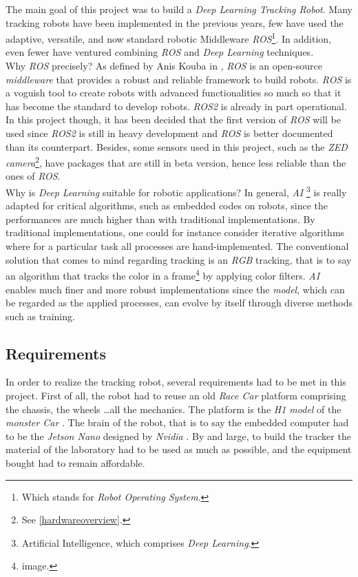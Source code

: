 		The main goal of this project was to build a \textit{Deep Learning Tracking Robot}. Many tracking
		robots have been implemented in the previous years, few have used the adaptive, versatile, and 
		now standard robotic Middleware \textit{ROS}\footnote{Which stands for \textit{Robot Operating System}.}.
		In addition, even fewer have ventured combining \textit{ROS} and \textit{Deep Learning} techniques.
		\\\indent Why \textit{ROS} precisely? As defined by Anis Kouba in \cite{ros}, \textit{ROS}
		is an \frstg{} open-source \textit{middleware} \lstg{} that provides a robust and reliable framework 
		to build robots. \textit{ROS} is a voguish tool to create robots with advanced functionalities so much so 
		that it has become the standard to develop robots. \textit{ROS2} is already in part 
		operational. In this project though, 
		it has been decided that the first version of \textit{ROS} will be used since \textit{ROS2} is still 
		in heavy development and \textit{ROS} is better documented than its counterpart. Besides, 
		some sensors used in this project, such as
		the \textit{ZED camera}\footnote{See \vref{hardwareoverview}.},
		have packages that are still in beta version, hence less reliable than the ones
		of \textit{ROS}.
		\\\indent Why is \textit{Deep Learning} suitable for robotic applications? In general, \textit{AI}
		\footnote{Artificial Intelligence, which comprises \textit{Deep Learning}.}
		is really adapted for critical algorithms, such as embedded codes
		on robots, since the performances are much higher than with traditional implementations. By traditional
		implementations, one could for instance consider iterative algorithms where for a particular task 
		all processes are hand-implemented. The conventional solution 
		that comes to mind regarding tracking is an \textit{RGB} tracking, that is to say an 
		algorithm that tracks the color in a frame\footnote{image.} by applying 
		color filters. \textit{AI} enables much finer and more robust
		implementations since the \textit{model},
		which can be regarded as the applied processes, can evolve by itself through diverse methods such as training.
		 
		\subsection{Requirements}
		
		In order to realize the tracking robot, several requirements had to be met in this
		project. First of all, the robot had to reuse an old \textit{Race Car} platform comprising
		the chassis, the wheels \dots all the mechanics. The platform is the \textit{H1 model}
		of the \textit{monster Car} \cite{datasheet}.
		The brain of the robot, that is to say 
		the embedded computer had to be the \textit{Jetson Nano} designed by \textit{Nvidia} \cite{nano}. By and
		large, to build the tracker the material of the laboratory had to be used as much as 
		possible, and the equipment bought had to remain affordable.
	
